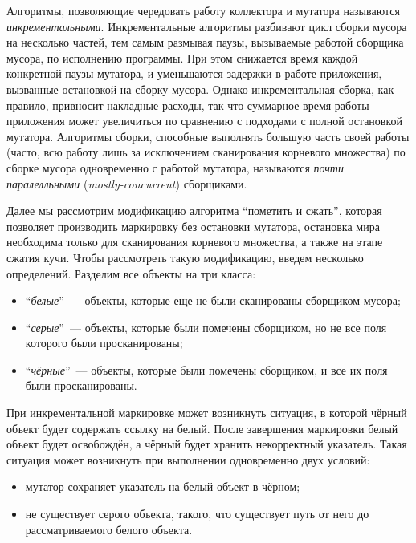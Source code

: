 Алгоритмы, позволяющие чередовать работу коллектора и мутатора называются 
\emph{инкрементальными}. 
Инкрементальные алгоритмы разбивают цикл сборки мусора на несколько частей, 
тем самым размывая паузы, вызываемые работой сборщика мусора, по исполнению программы.
При этом снижается время каждой конкретной паузы мутатора, 
и уменьшаются задержки в работе приложения, вызванные остановкой на сборку мусора. 
Однако инкрементальная сборка, как правило, привносит накладные расходы, 
так что суммарное время работы приложения может увеличиться по сравнению 
с подходами с полной остановкой мутатора. 
Алгоритмы сборки, способные выполнять большую часть своей работы (часто, всю работу 
лишь за исключением сканирования корневого множества) по сборке мусора одновременно 
с работой мутатора, называются \emph{почти паралелльными} (\emph{mostly-concurrent}) 
сборщиками.  

Далее мы рассмотрим модификацию алгоритма ``пометить и сжать'', которая позволяет 
производить маркировку без остановки мутатора, остановка мира необходима только для 
сканирования корневого множества, а также на этапе сжатия кучи. 
Чтобы рассмотреть такую модификацию, введем несколько определений. 
Разделим все объекты на три класса: 

\begin{itemize}
\item 
	``\emph{белые}''~--- объекты, которые еще не были сканированы сборщиком мусора;
\item 
	``\emph{серые}''~--- объекты, которые были помечены сборщиком, но не все поля 
	которого были просканированы;
\item 
	``\emph{чёрные}''~--- объекты, которые были помечены сборщиком, и все их поля 
	были просканированы.
\end{itemize}

При инкрементальной маркировке может возникнуть ситуация, в которой чёрный объект 
будет содержать ссылку на белый. 
После завершения маркировки белый объект будет освобождён, а чёрный будет хранить 
некорректный указатель. 
Такая ситуация может возникнуть при выполнении одновременно двух условий:
\begin{itemize}
\item 
	мутатор сохраняет указатель на белый объект в чёрном;
\item 
	не существует серого объекта, такого, что существует путь от него до рассматриваемого 
	белого объекта.
\end{itemize}

